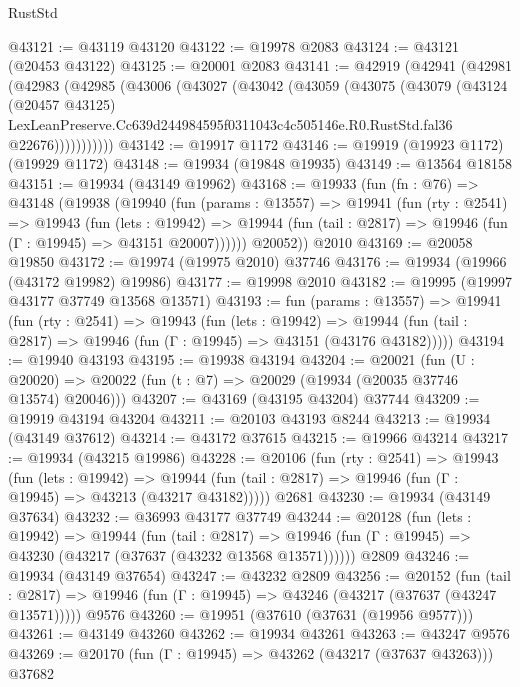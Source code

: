 \begin{lexlean}{RustStd}
\begin{coremodule}
@43121 := @43119 @43120
@43122 := @19978 @2083
@43124 := @43121 (@20453 @43122)
@43125 := @20001 @2083
@43141 := @42919
    (@42941
      (@42981
        (@42983
          (@42985
            (@43006
              (@43027
                (@43042
                  (@43059
                    (@43075
                      (@43079
                        (@43124
                          (@20457 @43125)
                          LexLeanPreserve.Cc639d244984595f0311043c4c505146e.R0.RustStd.fal36
                          @22676)))))))))))
@43142 := @19917 @1172
@43146 := @19919 (@19923 @1172) (@19929 @1172)
@43148 := @19934 (@19848 @19935)
@43149 := @13564 @18158
@43151 := @19934 (@43149 @19962)
@43168 := @19933
    (fun (fn : @76) =>
    @43148
      (@19938
        (@19940
          (fun (params : @13557) =>
          @19941
            (fun (rty : @2541) =>
            @19943
              (fun (lets : @19942) =>
              @19944 (fun (tail : @2817) => @19946 (fun (Γ : @19945) => @43151 @20007))))))
        @20052))
    @2010
@43169 := @20058 @19850
@43172 := @19974 (@19975 @2010) @37746
@43176 := @19934 (@19966 (@43172 @19982) @19986)
@43177 := @19998 @2010
@43182 := @19995 (@19997 @43177 @37749 @13568 @13571)
@43193 := fun (params : @13557) =>
  @19941
    (fun (rty : @2541) =>
    @19943
      (fun (lets : @19942) =>
      @19944 (fun (tail : @2817) => @19946 (fun (Γ : @19945) => @43151 (@43176 @43182)))))
@43194 := @19940 @43193
@43195 := @19938 @43194
@43204 := @20021
    (fun (U : @20020) => @20022 (fun (t : @7) => @20029 (@19934 (@20035 @37746 @13574) @20046)))
@43207 := @43169 (@43195 @43204) @37744
@43209 := @19919 @43194 @43204
@43211 := @20103 @43193 @8244
@43213 := @19934 (@43149 @37612)
@43214 := @43172 @37615
@43215 := @19966 @43214
@43217 := @19934 (@43215 @19986)
@43228 := @20106
    (fun (rty : @2541) =>
    @19943
      (fun (lets : @19942) =>
      @19944 (fun (tail : @2817) => @19946 (fun (Γ : @19945) => @43213 (@43217 @43182)))))
    @2681
@43230 := @19934 (@43149 @37634)
@43232 := @36993 @43177 @37749
@43244 := @20128
    (fun (lets : @19942) =>
    @19944
      (fun (tail : @2817) =>
      @19946 (fun (Γ : @19945) => @43230 (@43217 (@37637 (@43232 @13568 @13571))))))
    @2809
@43246 := @19934 (@43149 @37654)
@43247 := @43232 @2809
@43256 := @20152
    (fun (tail : @2817) => @19946 (fun (Γ : @19945) => @43246 (@43217 (@37637 (@43247 @13571)))))
    @9576
@43260 := @19951 (@37610 (@37631 (@19956 @9577)))
@43261 := @43149 @43260
@43262 := @19934 @43261
@43263 := @43247 @9576
@43269 := @20170 (fun (Γ : @19945) => @43262 (@43217 (@37637 @43263))) @37682

\end{coremodule}
\end{lexlean}
